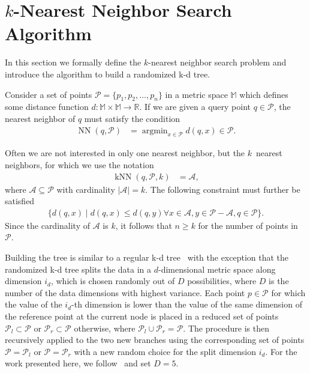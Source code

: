 \section{$k$-Nearest Neighbor Search Algorithm}
  \label{sec:_k_nearest_neighbor_search_algorithm}

  In this section we formally define the $k$-nearest neighbor search problem 
  and introduce the algorithm to build a randomized k-d tree.

   Consider a set of points $\mathcal{P} 
  = \{p_1,p_2,\dots,p_n\}$ in a metric space $\mathbb{M}$ which defines some 
  distance function $d\colon\mathbb{M}\times\mathbb{M}\to\mathbb{R}$.  If we 
  are given a query point $q\in\mathcal{P}$, the nearest neighbor of $q$ must 
  satisfy the condition
  \begin{align}
    \label{eq:NN}
    \operatorname{NN}(q,\mathcal{P}) &= \operatorname{argmin}_{x\in\mathcal{P}} 
    d(q,x)\in\mathcal{P}.
  \end{align}

  Often we are not interested in only one nearest neighbor, but the $k$~nearest 
  neighbors, for which we use the notation
  \begin{align}
    \label{eq:kNN}
    \operatorname{kNN}(q,\mathcal{P},k) &= \mathcal{A},
  \end{align}
  where $\mathcal{A}\subseteq\mathcal{P}$ with cardinality 
  $\vert\mathcal{A}\vert = k$.  The following constraint must further be 
  satisfied
  \begin{align}
    \label{eq:constraint_kNN}
    \{d(q,x)\mid d(q,x)\leq d(q,y)\forall x\in\mathcal{A}, 
    y\in\mathcal{P}-\mathcal{A},q\in\mathcal{P}\}.
  \end{align}
  Since the cardinality of $\mathcal{A}$ is $k$, it follows that $n\geq k$ for 
  the number of points in $\mathcal{P}$.

   Building the tree is similar to a regular 
  k-d tree~\cite{bentley1975a,friedman1977a} with the exception that the 
  randomized k-d tree splits the data in a $d$-dimensional metric space along 
  dimension $i_d$, which is chosen randomly out of $D$ possibilities, where $D$ 
  is the number of the data dimensions with highest variance.  Each point 
  $p\in\mathcal{P}$ for which the value of the $i_d$-th dimension is lower than 
  the value of the same dimension of the reference point at the current node is 
  placed in a reduced set of points $\mathcal{P}_l\subset\mathcal{P}$ or 
  $\mathcal{P}_r\subset\mathcal{P}$ otherwise, where 
  $\mathcal{P}_l\cup\mathcal{P}_r = \mathcal{P}$.
  The procedure is then recursively applied to the two new branches using the 
  corresponding set of points $\mathcal{P}=\mathcal{P}_l$ or 
  $\mathcal{P}=\mathcal{P}_r$ with a new random choice for the split dimension 
  $i_d$.  For the work presented here, we follow~\cite{muja2009a} and set 
  $D=5$.
  

